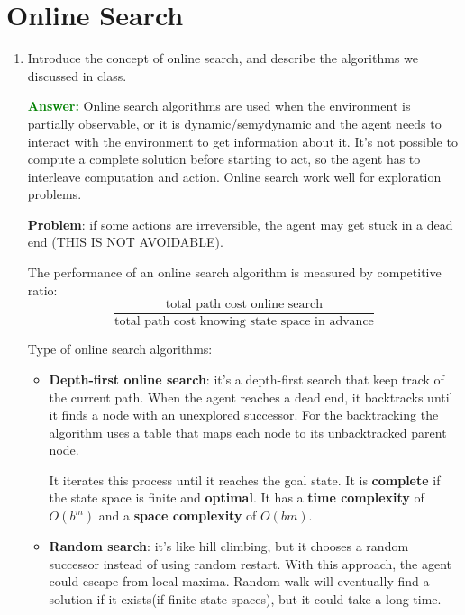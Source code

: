 \documentclass[12pt]{article}
\begin{document}
\section{Online Search}\label{onlinesearch}
\begin{enumerate}[label=\textbf{OS.\arabic*}]
    \item Introduce the concept of online search, and describe the algorithms we discussed in class.
    
    \textcolor{green}{\textbf{Answer:}}
    Online search algorithms are used when the environment is partially observable, or it is dynamic/semydynamic 
    and the agent needs to interact with the environment to get information about it.
    It's not possible to compute a complete solution before starting to act, so the agent has to interleave computation and action.
    Online search work well for exploration problems.
    
    \textbf{Problem}: if some actions are irreversible, the agent may get stuck in a dead end (THIS IS NOT AVOIDABLE).

    The performance of an online search algorithm is measured by competitive ratio:
    \begin{equation}
        \frac{\text{total path cost online search}}{\text{total path cost knowing state space in advance}}
        \label{eq:competitive-ratio}
    \end{equation}

    Type of online search algorithms:
    \begin{itemize}
        \item \textbf{Depth-first online search}: it's a depth-first search that keep track of the current path.
        When the agent reaches a dead end, it backtracks until it finds a node with an unexplored successor.
        For the backtracking the algorithm uses a table that maps each node to its unbacktracked parent node.

        It iterates this process until it reaches the goal state.
        It is \textbf{complete} if the state space is finite and \textbf{optimal}.
        It has a \textbf{time complexity} of $O(b^m)$ and a \textbf{space complexity} of $O(bm)$.
        \item \textbf{Random search}: it's like hill climbing, but it chooses a random successor instead of using random restart.
        With this approach, the agent could escape from local maxima.
        Random walk will eventually find a solution if it exists(if finite state spaces), but it could take a long time.
        

\end{itemize}
\end{enumerate}
\end{document}
